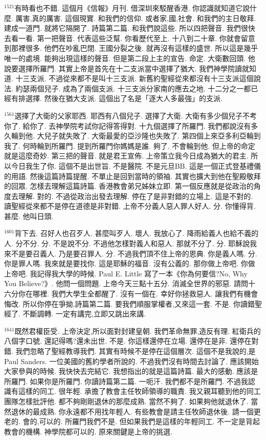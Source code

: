 \documentclass{book}
\begin{document}
$^{1521}$有時看也不錯.
這個月《信報》月刊.
借深圳來駁醒香港.
你認識就知道它說什麼.
厲害,真的厲害.
這個現實.
和我們的信仰.
或者家,國,社會.
和我們的主日敬拜.
建成一道門.
就將它隔開了.
詩篇第二篇.
和我們說這些.
所以四把聲音.
我們很快去看一看.
第一把聲音.
代表這些泛幫.
你看歷代至上.
十八到二十章.
你就會留意到那裡很多.
他們在吵亂巴閉.
王國分裂之後.
就再沒有這樣的盛世.
所以這是幾乎唯一的處境.
能夠出現這樣的聲音.
但是第二段上主的宣告.
命定.
大衛數回頭.
他說要選擇所羅門.
其實上帝是首先在十二支派當中選擇了猶大.
我們神學院讀就知道.
十三支派.
不過從來都不是叫十三支派.
新舊約聖經從來都沒有十三支派這個說法.
約瑟兩個兒子.
成為了兩個支派.
十三支派分家南的應去之地.
十二分之一都已經有排選擇.
然後在猶大支派.
這個出了名是「逐大人多最強」的支派.

$^{1561}$選擇了大衛的父家耶西.
耶西有八個兒子.
選擇了大衛.
大衛有多少個兒子不考你了.
給你了.
去神學院考試你記得答得對.
十九個選擇了所羅門.
我們都說沒有多久輪到他.
大兒子就失敗了.
大衛最愛的亞沙隆也失敗了.
第四個上來亞多利亞輪到我了.
何時輪到所羅門.
提到所羅門你媽媽是誰.
夠了.
不會輪到他.
但上帝的命定就是這麼奇妙.
第三把的聲音.
就是君王宣佈.
上帝策立我今日成為猶大的君主.
所以今日我生了你.
這個不是出世旨.
不是醫院.
不是元旦BB.
這是一個正式登基禮儀的用語.
然後這篇詩篇提醒.
不單止是回到當時的領袖.
其實也擴大到他在聖殿敬拜的回眾.
怎樣去理解這篇詩篇.
香港教會弟兄姊妹立即.
第一個反應就是從政治的角度去理解.
對的.
不過從政治出發去理解.
停在了是非對錯的立場上.
這是不對的.
讀聖經從來都不是停在道德是非對錯.
上帝不分義人惡人罪人好人.
分.
你懂得背.
甚麼.
他叫日頭.

$^{1601}$背下去.
召好人也召歹人.
甚麼叫歹人.
壞人.
我放心了.
降雨給義人也給不義的人.
分不分.
分.
不是說不分.
不過他怎樣對義人和惡人.
那就不分了.
分.
耶穌說我來不是要召義人.
乃是要召罪人.
分.
不過我們頂不住上帝的恩典.
你是義人嗎.
分.
你是罪人嗎.
我來就是要找你.
這是耶穌的福音.
沒有公義的.
那你做上帝吧.
你做上帝吧.
我記得我大學的時候.
Paul E. Little 寫了一本《你為何要信?No, Why You Believe?》.
他問一個問題.
上帝今天三點十五分.
消滅全世界的邪惡.
請問十六分你在哪裡.
我們大學生全都醒了.
沒有一個在.
幸好你拯救惡人.
讓我們有機會悔改.
所以你停在爭拗,詩篇第二篇.
要我們順服掌權者,又來這一套.
不是.
你讀錯聖經了.
不斷調轉.
一定有講完,立即又跳出來講.

$^{1641}$既然君權臣受.
上帝決定,所以面對封建皇朝.
我們革命無罪,造反有理.
紅衛兵的八個字口號.
還記得嗎?還未出世.
不是.
你這樣還停在立場.
還停在是非.
還停在對錯.
我們忽略了聖經教導我們.
其實有時候不是停在這個層次.
這個不是我說的,是Paul Sanders.
一位美國的舊約學者所說的.
不過我們沒有時間去討論了.
應該開始大家參與的時候.
我快快去完結它.
我想指出的就是這篇詩篇.
最大的感動.
應該是所羅門.
如果你是所羅門.
你讀詩篇第二篇.
一呃汗.
我們都不是所羅門.
不過我認識有這樣的同工.
很年輕.
承擔了教會主任牧師領導的職責.
我又親耳聽到他的同工團隊怎樣批評他.
都不夠剛剛退休的那麼成熟.
當然不夠了.
如果夠他就退休了.
當然退休的最成熟.
你永遠都不用找年輕人.
有些教會是請主任牧師退休後.
請一個更老的.
會的,可以的.
所羅門我們不是.
但如果我們是這樣的年輕同工.
不一定是背起教會的機構.
神學院都可以的.
原來關鍵是上帝的挑選.
\end{document}
